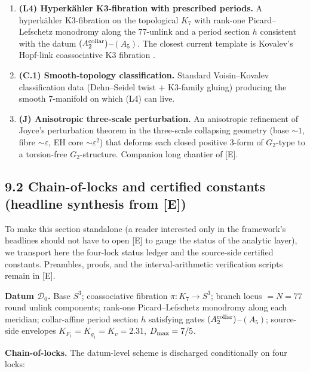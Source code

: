 \documentclass[11pt,a4paper]{article}
\begin{document}
\begin{itemize}
  \begin{enumerate}
  \def\labelenumi{\arabic{enumi}.}
  \tightlist
  \item
    \textbf{(L4) Hyperkähler K3-fibration with prescribed periods.} A hyperkähler K3-fibration on the topological \(K_7\) with rank-one Picard--Lefschetz monodromy along the 77-unlink and a period section \(h\) consistent with the datum \((A_2^{\rm collar})\)--\((A_5)\). The closest current template is Kovalev's Hopf-link coassociative K3 fibration \cite{13}.
  \item
    \textbf{(C.1) Smooth-topology classification.} Standard Voisin--Kovalev classification data \cite{21} (Dehn--Seidel twist + K3-family gluing) producing the smooth 7-manifold on which (L4) can live.
  \item
    \textbf{(J) Anisotropic three-scale perturbation.} An anisotropic refinement of Joyce's perturbation theorem in the three-scale collapsing geometry (base \(\sim 1\), fibre \(\sim \varepsilon\), EH core \(\sim \varepsilon^2\)) that deforms each closed positive \(3\)-form of \(G_2\)-type to a torsion-free \(G_2\)-structure. Companion long chantier of {[}E{]}.
  \end{enumerate}
\end{itemize}

\subsection{9.2 Chain-of-locks and certified constants (headline synthesis from {[}E{]})}\label{chain-of-locks-and-certified-constants-headline-synthesis-from-e}

To make this section standalone (a reader interested only in the framework's headlines should not have to open {[}E{]} to gauge the status of the analytic layer), we transport here the four-lock status ledger and the source-side certified constants. Preambles, proofs, and the interval-arithmetic verification scripts remain in {[}E{]}.

\textbf{Datum \(\mathcal D_0\).} Base \(S^3\); coassociative fibration \(\pi: K_7 \to S^3\); branch locus \(= N = 77\) round unlink components; rank-one Picard--Lefschetz monodromy along each meridian; collar-affine period section \(h\) satisfying gates \((A_2^{\rm collar})\)--\((A_5)\); source-side envelopes \(K_{F_1} = K_{g_1} = K_v = 2.31\), \(D_{\rm max} = 7/5\).

\textbf{Chain-of-locks.} The datum-level scheme is discharged conditionally on four locks:
\end{document}
